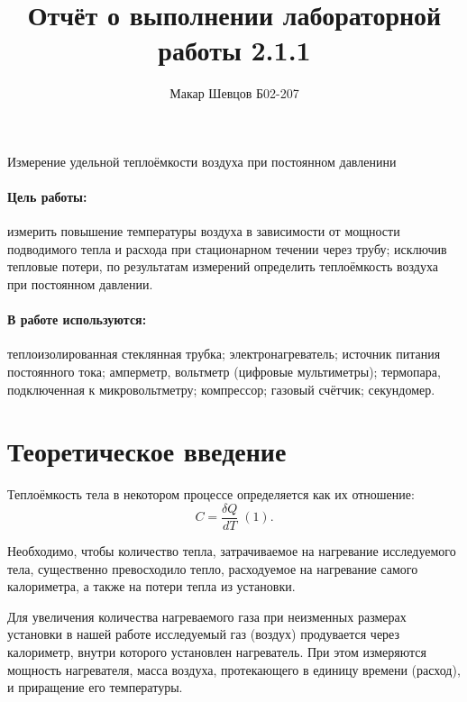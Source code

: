 \documentclass[a4paper,12pt]{article}
\author{Макар Шевцов Б02-207}
\title{Отчёт о выполнении лабораторной работы 2.1.1}
\begin{document}
	\maketitle
	\begin{center}
		{\Large Измерение удельной теплоёмкости воздуха при постоянном давленини}
	\end{center}
	\paragraph*{Цель работы:} измерить повышение температуры воздуха в зависимости от мощности
	подводимого тепла и расхода при стационарном течении через трубу; исключив тепловые потери, по результатам измерений определить теплоёмкость воздуха при постоянном давлении.
	\paragraph*{В работе используются:} теплоизолированная стеклянная трубка; электронагреватель; источник питания постоянного тока; амперметр, вольтметр (цифровые мультиметры); термопара, подключенная к микровольтметру; компрессор; газовый счётчик;
	секундомер.
	\section{Теоретическое введение}
	
		 Теплоёмкость тела в некотором процессе определяется как их отношение: $$ C = \frac{\delta Q}{dT} \; (1).$$
		 
		 Необходимо, чтобы количество тепла, затрачиваемое на нагревание исследуемого тела, существенно превосходило тепло, расходуемое на нагревание самого калориметра, а также на потери тепла из установки.
		 
		 Для увеличения количества нагреваемого газа при неизменных размерах установки в нашей работе исследуемый газ (воздух) продувается через калориметр, внутри которого установлен нагреватель. При этом
		 измеряются мощность нагревателя, масса воздуха, протекающего в единицу
		 времени (расход), и приращение его температуры.
		 
\end{document}
